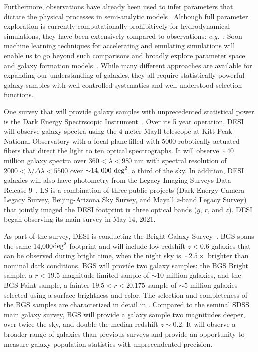 Furthermore, observations have already been used to infer parameters that
dictate the physical processes in semi-analytic
models~\citep[\emph{e.g.}][]{henriques2009, lu2014, henriques2015} 
Although full parameter exploration is currently computationally prohibitively
for hydrodynamical simulations, they have been extensively compared to
observations: \emph{e.g.}~\cite{genel2014, dave2017a, trayford2017, dickey2021,
donnari2021}.
Soon machine learning techniques for accelerating and emulating simulations
will enable us to go beyond such comparisons and broadly explore parameter
space and galaxy formation
models~\citep[\emph{e.g.}][]{villaescusa-navarro2022a, jamieson2022}.
While many different approaches are available for expanding our understanding
of galaxies, they all require statistically powerful galaxy samples with
well controlled systematics and well understood selection functions. 

One survey that will provide galaxy samples with unprecedented statistical power
is the Dark Energy Spectrscopic
Instrument~\citep[DESI;][]{desicollaboration2016, desicollaboration2016a,
abareshi2022}. 
Over its 5 year operation, DESI will observe galaxy spectra using the 4-meter
Mayll telescope at Kitt Peak National Observatory with a focal plane filled
with 5000 robotically-actuated fibers that direct the light to ten optical
spectrographs.
It will observe $\sim$40 million galaxy spectra over $360 < \lambda < 980$ nm
with spectral resolution of $2000 < \lambda/\Delta \lambda < 5500$ over 
${\sim}14,000~{\rm deg}^2$, a third of the sky.
In addition, DESI galaxies will also have photometry from the Legacy Imaging
Surveys Data Release 9~\citep[LS;][]{dey2019}. 
LS is a combination of three public projects (Dark Energy Camera Legacy Survey,
Beijing-Arizona Sky Survey, and Mayall $z$-band Legacy Survey) that jointly
imaged the DESI footprint in three optical bands ($g$, $r$, and $z$). 
DESI began observing its main survey in May 14, 2021. 

As part of the survey, DESI is conducting the Bright Galaxy
Survey~\citep[BGS;][]{hahn2022c}.
BGS spans the same 14,000${\rm deg}^2$ footprint and will include low redshift
$z< 0.6$ galaxies that can be observed during bright time, when the night sky
is ${\sim}2.5\times$ brighter than nominal dark conditions,
BGS will provide two galaxy samples: the BGS Bright sample, a $r < 19.5$
magnitude-limited sample of ${\sim}10$ million galaxies, and the BGS Faint
sample, a fainter $19.5 < r < 20.175$ sample of ${\sim 5}$ million galaxies
selected using a surface brightness and color. 
The selection and completeness of the BGS samples are characterized in detail
in \cite{hahn2022c}. 
Compared to the seminal SDSS main galaxy survey, BGS will provide a galaxy
sample two magnitudes deeper, over twice the sky, and double the median
redshift $z{\sim}0.2$. 
It will observe a broader range of galaxies than previous surveys  and provide
an opportunity to measure galaxy population statistics with unprecendented
precision.

